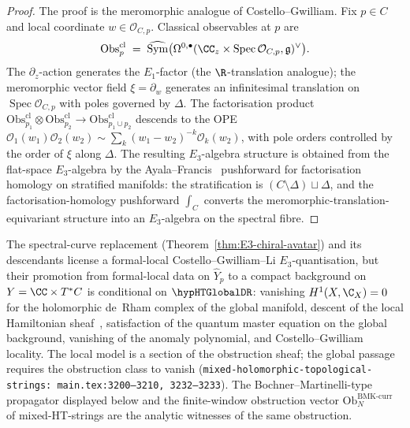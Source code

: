 \begin{proof}
The proof is the meromorphic analogue of Costello--Gwilliam. Fix
$p\in C$ and local coordinate $w\in \mathcal{O}_{C,p}$. Classical
observables at $p$ are
\[
\mathrm{Obs}^{\mathrm{cl}}_p \;=\;
\widehat{\operatorname{Sym}}\bigl(\Omega^{0,\bullet}(\CC_z\times
\operatorname{Spec}\mathcal{O}_{C,p}, \mathfrak{g})^\vee\bigr).
\]
The $\partial_z$-action generates the $E_1$-factor (the
$\R$-translation analogue); the meromorphic vector field
$\xi = \partial_w$ generates an infinitesimal translation on
$\operatorname{Spec}\mathcal{O}_{C,p}$ with poles governed by
$\Delta$. The factorisation product
$\mathrm{Obs}^{\mathrm{cl}}_{p_1}\otimes\mathrm{Obs}^{\mathrm{cl}}_{p_2}
\to \mathrm{Obs}^{\mathrm{cl}}_{p_1\cup p_2}$ descends to the OPE
$\mathcal{O}_1(w_1)\mathcal{O}_2(w_2) \sim
\sum_k (w_1-w_2)^{-k} \mathcal{O}_{k}(w_2)$, with pole orders
controlled by the order of $\xi$ along $\Delta$. The resulting
$E_3$-algebra structure is obtained from the flat-space
$E_3$-algebra by the Ayala--Francis~\cite{AF15} pushforward for
factorisation homology on stratified manifolds: the stratification
is $(C\setminus \Delta) \sqcup \Delta$, and the
factorisation-homology pushforward $\int_C$ converts the
meromorphic-translation-equivariant structure into an
$E_3$-algebra on the spectral fibre.
\end{proof}

\begin{remark}
\label{rem:ht-global-de-rham-bv-ht-physics}
The spectral-curve replacement
(Theorem~\ref{thm:E3-chiral-avatar}) and its descendants license a
formal-local Costello--Gwilliam--Li $E_3$-quantisation, but their
promotion from formal-local data on $\widehat{Y}_p$ to a compact
background on $Y = \CC\times T^*C$ is conditional on
$\hypHTGlobalDR$: vanishing $H^1(X,\C_X) = 0$ for the holomorphic
de~Rham complex of the global manifold, descent of the local
Hamiltonian sheaf~\cite[\S4--5]{CG17}, satisfaction of the quantum
master equation on the global background, vanishing of the anomaly
polynomial, and Costello--Gwilliam locality. The local model is a
section of the obstruction sheaf; the global passage requires the
obstruction class to vanish (\texttt{mixed-holomorphic-topological-strings:%
main.tex:3200--3210, 3232--3233}). The Bochner--Martinelli-type
propagator displayed below and the finite-window obstruction vector
$\mathrm{Ob}^{\mathrm{BMK\mbox{-}curr}}_N$ of mixed-HT-strings are the
analytic witnesses of the same obstruction.
\end{remark}

